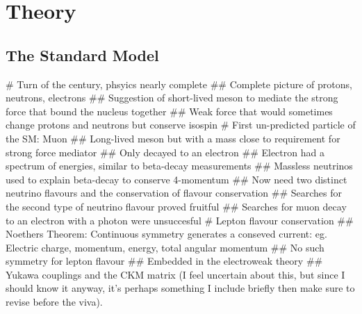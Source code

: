 \chapter{Theory}

\section{The Standard Model }
\begin{easylist}
    # Turn of the century, phsyics nearly complete
    ## Complete picture of protons, neutrons, electrons
    ## Suggestion of short-lived meson to mediate the strong force that bound the nucleus together
    ## Weak force that would sometimes change protons and neutrons but conserve isospin
    # First un-predicted particle of the SM: Muon
    ## Long-lived meson but with a mass close to requirement for strong force mediator
    ## Only decayed to an electron
    ## Electron had a spectrum of energies, similar to beta-decay measurements
    ## Massless neutrinos used to explain beta-decay to conserve 4-momentum
    ## Now need two distinct neutrino flavours and the conservation of flavour conservation
    ## Searches for the second type of neutrino flavour proved fruitful
    ## Searches for muon decay to an electron with a photon were unsuccesful
    # Lepton flavour conservation
    ## Noethers Theorem: Continuous symmetry generates a conseved current: eg. Electric charge, momentum, energy, total angular momentum
    ## No such symmetry for lepton flavour
    ## Embedded in the electroweak theory
    ## Yukawa couplings and the CKM matrix (I feel uncertain about this, but since I should know it anyway, it's perhaps something I include briefly then make sure to revise before the viva).
\end{easylist}
